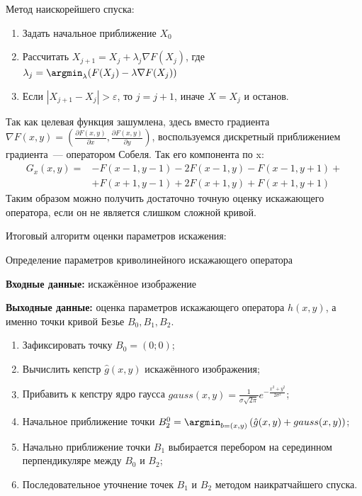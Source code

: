Метод наискорейшего спуска:
\begin{enumerate}
	\item Задать начальное приближение $X_0$
	\item Рассчитать $X_{j+1} = X_j + \lambda_j \nabla F(X_j)$, где $\lambda_j = \argmin_{\lambda} (F(X_j) - \lambda\nabla F(X_j))$
	\item Если $|X_{j+1}-X_j| > \varepsilon$, то $j = j+1$, иначе $X = X_j$ и останов.
\end{enumerate}

Так как целевая функция зашумлена, здесь вместо градиента $\nabla F(x,y) = \left(\frac{\partial F(x,y)}{\partial x}, \frac{\partial F(x,y)}{\partial y}\right)$, воспользуемся дискретный приближением градиента~--- оператором Собеля. Так его компонента по x:
\begin{equation*}
	\begin{aligned}
		G_x(x,y) = &-F(x-1, y-1) - 2F(x-1, y) - F(x-1, y+1) + \\
                   &+F(x+1, y-1) + 2F(x+1, y) + F(x+1, y+1)
	\end{aligned}
\end{equation*}
Таким образом можно получить достаточно точную оценку искажающего оператора, если он не является слишком сложной кривой.

Итоговый алгоритм оценки параметров искажения:
\begin{algorithm} Определение параметров криволинейного искажающего оператора
	
	\textbf{Входные данные:} искажённое изображение

	\textbf{Выходные данные:} оценка параметров искажающего оператора $h(x,y)$, а именно точки кривой Безье $B_0, B_1, B_2$.
	\begin{enumerate}
		\item Зафиксировать точку $B_0 = (0;0)$;
		\item Вычислить кепстр $\hat{g}(x,y)$ искажённого изображения;
		\item Прибавить к кепстру ядро гаусса $gauss(x,y) = \frac{1}{\sigma\sqrt{2\pi}}e^{-\frac{x^2+y^2}{2\sigma^2}}$;
		\item Начальное приближение точки $B_2^0 = \argmin_{b=(x,y)} \left(\hat{g}(x,y) + gauss(x,y)\right)$;
		\item Начально приближение точки $B_1$ выбирается перебором на серединном перпендикуляре между $B_0$ и $B_2$;
		\item Последовательное уточнение точек $B_1$ и $B_2$ методом наикратчайшего спуска. 
	\end{enumerate}
	\label{algo:curve}
\end{algorithm}

